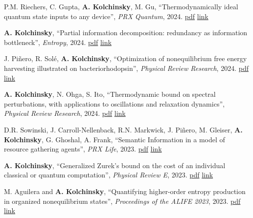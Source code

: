 
\newcommand{\pdflink}[1]{\href{https://artemyk.github.io/assets/pdf/papers/#1.pdf}{pdf}}
\newcommand{\publink}[1]{\href{#1}{link}}

P.M. Riechers, C. Gupta, \textbf{A. Kolchinsky}, M. Gu, ``Thermodynamically ideal quantum state inputs to any device'', \emph{PRX Quantum}, 2024. \pdflink{Riechers_2024_ThermodynamicallyIdealInputs} \publink{https://journals.aps.org/prxquantum/abstract/10.1103/PRXQuantum.5.030318}

\textbf{A. Kolchinsky}, ``Partial information decomposition: redundancy as information bottleneck'', \emph{Entropy}, 2024. \pdflink{Kolchinsky_2024_PIDasIB} \publink{https://www.mdpi.com/1099-4300/26/7/546}

J. Piñero, R. Solé, \textbf{A. Kolchinsky}, ``Optimization of nonequilibrium free energy harvesting illustrated on bacteriorhodopsin'', \emph{Physical Review Research}, 2024. \pdflink{Pinero_Sole_Kolchinsky_2024_OptimizationOfFreeEnergyHarvesting} \publink{https://journals.aps.org/prresearch/abstract/10.1103/PhysRevResearch.6.013275}

\textbf{A. Kolchinsky}, N. Ohga, S. Ito, ``Thermodynamic bound on spectral perturbations, with applications to oscillations and relaxation dynamics'', \emph{Physical Review Research}, 2024. \pdflink{Kolchinsky_Ohga_Ito_ThermodynamicBoundOnSpectralPerturbations} \publink{https://journals.aps.org/prresearch/pdf/10.1103/PhysRevResearch.6.013082}

D.R. Sowinski, J. Carroll-Nellenback, R.N. Markwick, J. Piñero, M. Gleiser, \textbf{A. Kolchinsky}, G. Ghoshal, A. Frank, ``Semantic Information in a model of resource gathering agents'', \emph{PRX Life}, 2023. \pdflink{Sowinski-SemanticInformationInAModelOfResourceGatheringAgents} \publink{https://journals.aps.org/prxlife/abstract/10.1103/PRXLife.1.023003}

\textbf{A. Kolchinsky}, ``Generalized Zurek's bound on the cost of an individual classical or quantum computation'', \emph{Physical Review E}, 2023. \pdflink{Kolchinsky_2023_GeneralizedZureksBound} \publink{https://journals.aps.org/pre/abstract/10.1103/PhysRevE.108.034101}

M. Aguilera and \textbf{A. Kolchinsky}, ``Quantifying higher-order entropy production in organized nonequilibrium states'', \emph{Proceedings of the ALIFE 2023}, 2023. \pdflink{Aguilera_2023_QuantifyingHigherOrderEP} \publink{https://direct.mit.edu/isal/proceedings/isal/35/45/116909}

